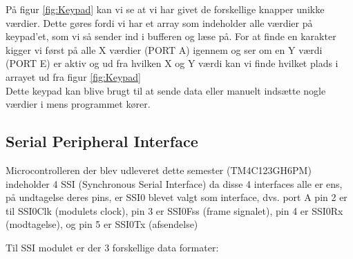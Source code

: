 På figur \ref{fig:Keypad} kan vi se at vi har givet de forskellige knapper unikke værdier. Dette gøres fordi vi har et array som indeholder alle værdier på keypad’et, som vi så sender ind i bufferen og læse på. For at finde en karakter kigger vi først på alle X værdier (PORT A) igennem og ser om en Y værdi (PORT E) er aktiv og ud fra hvilken X og Y værdi kan vi finde hvilket plads i arrayet ud fra figur \ref{fig:Keypad}
\\
Dette keypad kan blive brugt til at sende data eller manuelt indsætte nogle værdier i mens programmet kører.




\subsection{Serial Peripheral Interface}
\label{subsec:SPI}

Microcontrolleren der blev udleveret dette semester (TM4C123GH6PM) indeholder 4 SSI (Synchronous Serial Interface) da disse 4 interfaces alle er ens, på undtagelse deres pins, er SSI0 blevet valgt som interface, dvs. port A pin 2 er til SSI0Clk (modulets clock), pin 3 er SSI0Fss (frame signalet), pin 4 er SSI0Rx (modtagelse), og pin 5 er SSI0Tx (afsendelse)

Til SSI modulet er der 3 forskellige data formater:


